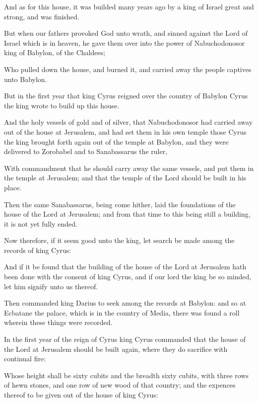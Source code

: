 {\par }{\PP {}And as for this house, it was builded many years ago by a king of Israel great and strong, and was finished.
\par }{\PP {}But when our fathers provoked God unto wrath, and sinned against the Lord of Israel which is in heaven, he gave them over into the power of Nabuchodonosor king of Babylon, of the Chaldees;
\par }{\PP {}Who pulled down the house, and burned it, and carried away the people captives unto Babylon.
\par }{\PP {}But in the first year that king Cyrus reigned over the country of Babylon Cyrus the king wrote to build up this house.
\par }{\PP {}And the holy vessels of gold and of silver, that Nabuchodonosor had carried away out of the house at Jerusalem, and had set them in his own temple those Cyrus the king brought forth again out of the temple at Babylon, and they were delivered to Zorobabel and to Sanabassarus the ruler,
\par }{\PP {}With commandment that he should carry away the same vessels, and put them in the temple at Jerusalem; and that the temple of the Lord should be built in his place.
\par }{\PP {}Then the same Sanabassarus, being come hither, laid the foundations of the house of the Lord at Jerusalem; and from that time to this being still a building, it is not yet fully ended.
\par }{\PP {}Now therefore, if it seem good unto the king, let search be made among the records of king Cyrus:
\par }{\PP {}And if it be found that the building of the house of the Lord at Jerusalem hath been done with the consent of king Cyrus, and if our lord the king be so minded, let him signify unto us thereof.
\par }{\PP {}Then commanded king Darius to seek among the records at Babylon: and so at Ecbatane the palace, which is in the country of Media, there was found a roll wherein these things were recorded.
\par }{\PP {}In the first year of the reign of Cyrus king Cyrus commanded that the house of the Lord at Jerusalem should be built again, where they do sacrifice with continual fire:
\par }{\PP {}Whose height shall be sixty cubits and the breadth sixty cubits, with three rows of hewn stones, and one row of new wood of that country; and the expences thereof to be given out of the house of king Cyrus:
}
